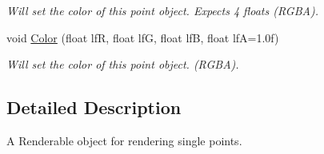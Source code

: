 \begin{DoxyCompactItemize}
\begin{DoxyCompactList}\small\item\em Will set the color of this point object. Expects 4 floats (RGBA). \end{DoxyCompactList}\item 
\hypertarget{classc_point_aa6f3c2383b2bc6b41b4ea854c04f73fc}{
void \hyperlink{classc_point_aa6f3c2383b2bc6b41b4ea854c04f73fc}{Color} (float lfR, float lfG, float lfB, float lfA=1.0f)}
\label{classc_point_aa6f3c2383b2bc6b41b4ea854c04f73fc}

\begin{DoxyCompactList}\small\item\em Will set the color of this point object. (RGBA). \end{DoxyCompactList}\end{DoxyCompactItemize}


\subsection{Detailed Description}
A Renderable object for rendering single points. 